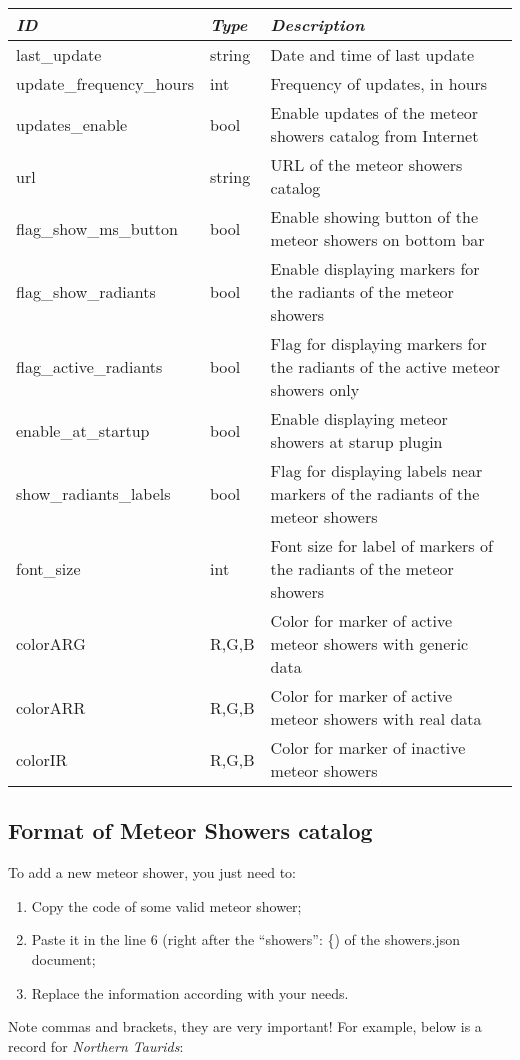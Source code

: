 \noindent%
\begin{tabularx}{\textwidth}{l|l|X}\toprule
\emph{ID}            & \emph{Type} & \emph{Description}\\\midrule
last\_update          & string & Date and time of last update \\%
update\_frequency\_hours & int & Frequency of updates, in hours \\%
updates\_enable         & bool & Enable updates of the meteor showers catalog from Internet \\%
url                   & string & URL of the meteor showers catalog \\%
flag\_show\_ms\_button  & bool & Enable showing button of the meteor showers on bottom bar \\%
flag\_show\_radiants    & bool & Enable displaying markers for the radiants of the meteor showers \\%
flag\_active\_radiants  & bool & Flag for displaying markers for the radiants of the active meteor showers only \\%
enable\_at\_startup     & bool & Enable displaying meteor showers at starup plugin \\%
show\_radiants\_labels  & bool & Flag for displaying labels near markers of the radiants of the meteor showers \\%
font\_size              & int  & Font size for label of markers of the radiants of the meteor showers \\%
colorARG               & R,G,B & Color for marker of active meteor showers with generic data \\%
colorARR               & R,G,B & Color for marker of active meteor showers with real data \\%
colorIR                & R,G,B & Color for marker of inactive meteor showers \\\bottomrule
\end{tabularx}


\subsection{Format of Meteor Showers catalog}
\label{sec:plugins:MeteorShowers:format}

To add a new meteor shower, you just need to:
\begin{enumerate}
\item Copy the code of some valid meteor shower;
\item Paste it in the line 6 (right after the ``showers'': \{) of the showers.json document;
\item Replace the information according with your needs.
\end{enumerate}
Note commas and brackets, they are very important! For example, below is a record for \textit{Northern Taurids}:

